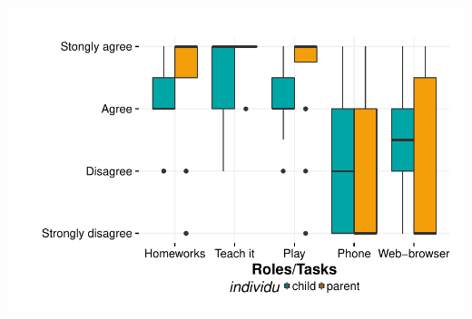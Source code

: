 \documentclass{article}
\begin{document}
\includegraphics{interviews/interviews-plot_functionality_parent_enfant}
\end{document}
